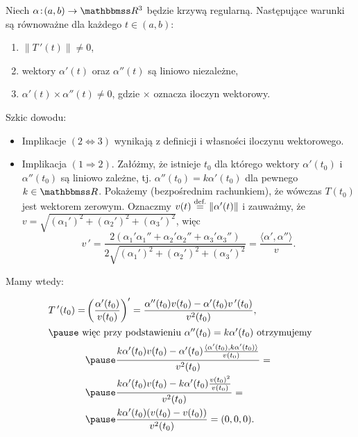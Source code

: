 \begin{frame}[<+->]

\begin{lemat}
Niech $\alpha\colon (a,b)\to \R^3$ będzie krzywą regularną. Następujące warunki są równoważne dla każdego $t\in (a,b)$:
\begin{enumerate}
\item $\|T\,'(t)\|\neq 0$,
\item wektory $\alpha'(t)$ oraz $\alpha''(t)$ są liniowo niezależne,
\item $\alpha'(t)\times \alpha''(t)\neq 0$, gdzie $\times$ oznacza iloczyn wektorowy.
\end{enumerate}
\end{lemat}


\end{frame}
\begin{frame}
\textcolor{ared}{Szkic dowodu:}

\begin{itemize}
\pause\item Implikacje $(2\Leftrightarrow 3)$ wynikają z definicji i własności iloczynu wektorowego.
\pause \item Implikacja $(1\Rightarrow 2)$.
Załóżmy, że istnieje $t_0$ dla którego wektory $\alpha'(t_0)$ i $\alpha''(t_0)$ są liniowo zależne, tj. $\alpha''(t_0)=k\alpha'(t_0)$ dla pewnego $k\in \R$. \pause Pokażemy (bezpośrednim rachunkiem), że wówczas $T(t_0)$ jest wektorem zerowym. \pause Oznaczmy $v(t)\define\|\alpha'(t)\|$ i zauważmy, że $v=\sqrt{(\alpha_1')^2+(\alpha_2')^2+(\alpha_3')^2}$, \pause więc \[v\,'=\frac{2(\alpha_1'\alpha_1''+\alpha_2'\alpha_2''+\alpha_3'\alpha_3'')}{2\sqrt{(\alpha_1')^2+(\alpha_2')^2+(\alpha_3')^2}}=\frac{\langle\alpha',\alpha''\rangle}{v}.\]
\end{itemize}
\end{frame}
\begin{frame}[<+->]
Mamy wtedy:

\begin{align*}
T\,'(t_0)=&\left(\frac{\alpha'(t_0)}{v(t_0)}\right)'=\frac{\alpha''(t_0) v(t_0)-\alpha'(t_0)v\,'(t_0)}{v^2(t_0)}, \\
\intertext{\pause więc przy podstawieniu $\alpha''(t_0)=k\alpha'(t_0)$ otrzymujemy}
&\pause \frac{k\alpha'(t_0)v(t_0)-\alpha'(t_0)\frac{\langle \alpha'(t_0),k\alpha'(t_0)\rangle}{v(t_0)}}{v^2(t_0)}=\\
&\pause \frac{k\alpha'(t_0)v(t_0)-k\alpha'(t_0)\frac{v(t_0)^2}{v(t_0)}}{v^2(t_0)}=\\
&\pause\frac{k\alpha'(t_0)(v(t_0)-v(t_0))}{v^2(t_0)}=(0,0,0).
\end{align*}

\end{frame}
